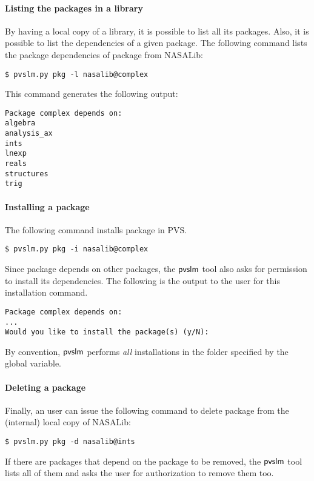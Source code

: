 \paragraph{Listing the packages in a library} By having a local
copy of a library, it is possible to list all its packages. Also, it
is possible to list the dependencies of a given package. The following
command lists the package dependencies of package  from
NASALib:
%
\begin{verbatim}
$ pvslm.py pkg -l nasalib@complex
\end{verbatim}
%
This command generates the following output:
%
\begin{verbatim}
Package complex depends on:
algebra
analysis_ax
ints
lnexp
reals
structures
trig
\end{verbatim}

\paragraph{Installing a package} The following command installs package
 in PVS.
%
\begin{verbatim}
$ pvslm.py pkg -i nasalib@complex
\end{verbatim}
%
Since package  depends on other packages, the $\textsf{pvslm}$
tool also asks for permission to install its dependencies. The
following is the output to the user for this installation command.
%
\begin{lstlisting}
Package complex depends on:
...
Would you like to install the package(s) (y/N): 
\end{lstlisting}
%
By convention, $\textsf{pvslm}$ performs {\em all} installations in the folder
specified by the  global variable.

\paragraph{Deleting a package} Finally, an user can issue the following
command to delete package  from the (internal) local copy of
NASALib:
%
\begin{verbatim}
$ pvslm.py pkg -d nasalib@ints
\end{verbatim}
%
If there are packages that depend on the package to be removed, the $\textsf{pvslm}$ tool
lists all of them and asks the user for authorization to remove them
too.
